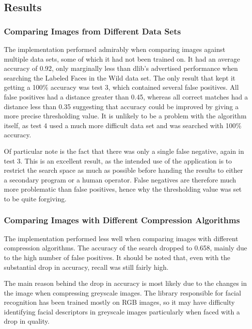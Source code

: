 \documentclass[12pt]{article}
\begin{document}
\subsection{Results}
\subsubsection{Comparing Images from Different Data Sets}
The implementation performed admirably when comparing images against multiple data sets, some of which it had not been trained on. It had an average accuracy of 0.92, only marginally less than dlib's advertised performance when searching the Labeled Faces in the Wild data set. The only result that kept it getting a 100\% accuracy was test 3, which contained several false positives. All false positives had a distance greater than 0.45, whereas all correct matches had a distance less than 0.35 suggesting that accuracy could be improved by giving a more precise thresholding value. It is unlikely to be a problem with the algorithm itself, as test 4 used a much more difficult data set and was searched with 100\% accuracy.

Of particular note is the fact that there was only a single false negative, again in test 3. This is an excellent result, as the intended use of the application is to restrict the search space as much as possible before handing the results to either a secondary program or a human operator. False negatives are therefore much more problematic than false positives, hence why the thresholding value was set to be quite forgiving.

\subsubsection{Comparing Images with Different Compression Algorithms}
The implementation performed less well when comparing images with different compression algorithms. The accuracy of the search dropped to 0.658, mainly due to the high number of false positives. It should be noted that, even with the substantial drop in accuracy, recall was still fairly high. 

The main reason behind the drop in accuracy is most likely due to the changes in the image when compressing greyscale images. The library responsible for facial recognition has been trained mostly on RGB images, so it may have difficulty identifying facial descriptors in greyscale images particularly when faced with a drop in quality.
\end{document}
